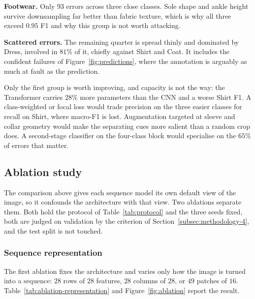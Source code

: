 \textbf{Footwear.} Only $93$ errors across three close classes. Sole shape and ankle height
survive downsampling far better than fabric texture, which is why all three exceed $0.95$ F1 and
why this group is not worth attacking.

\textbf{Scattered errors.} The remaining quarter is spread thinly and dominated by Dress,
involved in $81\%$ of it, chiefly against Shirt and Coat. It includes the confident failures of
Figure~\ref{fig:predictions}, where the annotation is arguably as much at fault as the
prediction.

Only the first group is worth improving, and capacity is not the way: the Transformer carries
$28\%$ more parameters than the CNN and a worse Shirt F1. A class-weighted or focal loss would
trade precision on the three easier classes for recall on Shirt, where macro-F1 is lost.
Augmentation targeted at sleeve and collar geometry would make the separating cues more salient
than a random crop does. A second-stage classifier on the four-class block would specialise on
the $65\%$ of errors that matter.

\subsection{Ablation study}
\label{subsec:results-6}

The comparison above gives each sequence model its own default view of the image, so it
confounds the architecture with that view. Two ablations separate them. Both hold the protocol of
Table~\ref{tab:protocol} and the three seeds fixed, both are judged on validation by the
criterion of Section~\ref{subsec:methodology-4}, and the test split is not touched.

\subsubsection{Sequence representation}
\label{subsubsec:ablation-representation}

The first ablation fixes the architecture and varies only how the image is turned into a
sequence: $28$ rows of $28$ features, $28$ columns of $28$, or $49$ patches of $16$.
Table~\ref{tab:ablation-representation} and Figure~\ref{fig:ablation} report the result.

